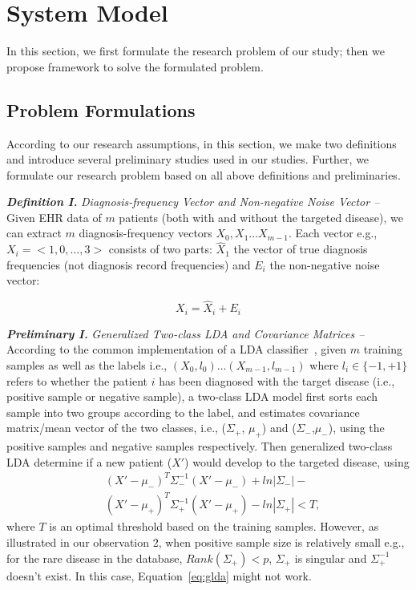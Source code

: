 \section{\TheName{} System Model}\label{sec:3}
In this section, we first formulate the research problem of our study; then we propose \TheName{} framework to solve the formulated problem.

\subsection{Problem Formulations}

According to our research assumptions, in this section, we make two definitions and introduce several preliminary studies used in our studies.
Further, we formulate our research problem based on all above definitions and preliminaries.


\textbf{\em Definition I.} \emph{Diagnosis-frequency Vector and Non-negative Noise Vector -- } Given EHR data of $m$ patients (both with and without the targeted disease), we can extract $m$ diagnosis-frequency vectors $X_0,X_1\dots X_{m-1}$.
Each vector e.g., $X_i=<1,0,\dots,3>$ consists of two parts: $\hat{X}_1$ the vector of true diagnosis frequencies (not diagnosis record frequencies) and $E_i$ the non-negative noise vector: 

\begin{equation}
X_i=\hat{X}_i+E_i
\end{equation}

\textbf{\em Preliminary I.
}\emph{Generalized Two-class LDA and Covariance Matrices -- } According to the common implementation of a LDA classifier~\cite{ziegel2003modern}, given $m$  training samples as well as the labels i.e., $(X_0,l_0)\dots (X_{m-1},l_{m-1})$ where $l_i\in\{-1,+1\}$ refers to whether the patient $i$ has been diagnosed with the target disease (i.e., positive sample or negative sample),  a two-class LDA  model first sorts each sample into two groups according to the label, and estimates covariance matrix/mean vector of the two classes, i.e., ($\Sigma_{+}$, $\mu_+$) and ($\Sigma_{-}$,$\mu_-$), using the positive samples and negative samples respectively.
Then generalized two-class LDA determine if a new patient ($X'$) would develop to the targeted disease, using 
%
\begin{equation}
\begin{aligned}
&(X'-\mu_-)^T\Sigma_{-}^{-1}(X'-\mu_-)+ln|\Sigma_-|-\\
&(X'-\mu_+)^T\Sigma_{+}^{-1}(X'-\mu_+)-ln|\Sigma_+|<T,
\end{aligned}
\label{eq:glda}
\end{equation}
where $T$ is an optimal threshold based on the training samples.
However, as illustrated in our observation 2,  when positive sample size is relatively small e.g., for the rare disease in the database,  $Rank(\Sigma_+)<p$,  $\Sigma_{+}$ is singular and $\Sigma_{+}^{-1}$  doesn't exist.
In this case, Equation~\ref{eq:glda} might not work.


